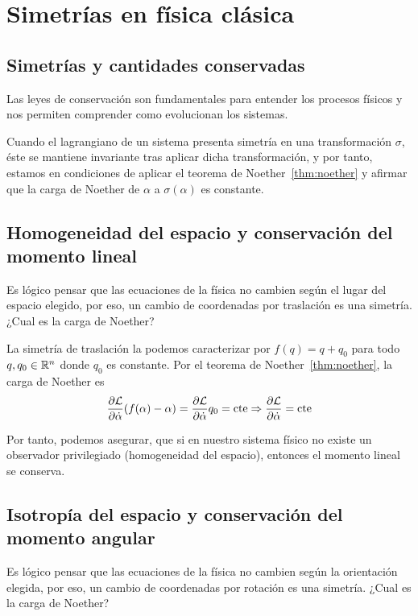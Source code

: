 \section{Simetrías en física clásica}\label{sec:simetrías-y-cantidades-conservadas-en-física-clásica}

\subsection{Simetrías y cantidades conservadas}\label{subsec:simetrías-y-cantidades-conservadas}
Las leyes de conservación son fundamentales para entender los procesos físicos y nos permiten comprender como evolucionan los sistemas.

Cuando el lagrangiano de un sistema presenta simetría en una transformación $\sigma$, éste se mantiene invariante tras aplicar dicha transformación, y por tanto, estamos en condiciones de aplicar el teorema de Noether~\eqref{thm:noether} y afirmar que la carga de Noether de $\alpha$ a $\sigma(\alpha)$ es constante.

\subsection{Homogeneidad del espacio y conservación del momento lineal}\label{subsec:homogeneidad-del-espacio-y-conservación-del-momento-lineal}
Es lógico pensar que las ecuaciones de la física no cambien según el lugar del espacio elegido, por eso, un cambio de coordenadas por traslación es una simetría.
¿Cual es la carga de Noether?

La simetría de traslación la podemos caracterizar por $f(q)=q+q_0$ para todo $q, q_0\in\mathbb{R}^n$ donde $q_0$ es constante.
Por el teorema de Noether~\eqref{thm:noether}, la carga de Noether es
\begin{equation}
	\label{eq:conservacion_momento_lineal}
	\frac{\partial \mathcal{L}}{\partial\dot{\alpha}}(f(\alpha)-\alpha) = \frac{\partial \mathcal{L}}{\partial\dot{\alpha}}q_0=\text{cte}\Rightarrow\frac{\partial \mathcal{L}}{\partial\dot{\alpha}}=\text{cte}
\end{equation}

Por tanto, podemos asegurar, que si en nuestro sistema físico no existe un observador privilegiado (homogeneidad del espacio), entonces el momento lineal se conserva.

\subsection{Isotropía del espacio y conservación del momento angular}\label{subsec:isotropic-del-espacio-y-conservación-del-momento-angular}
Es lógico pensar que las ecuaciones de la física no cambien según la orientación elegida, por eso, un cambio de coordenadas por rotación es una simetría.
¿Cual es la carga de Noether?

